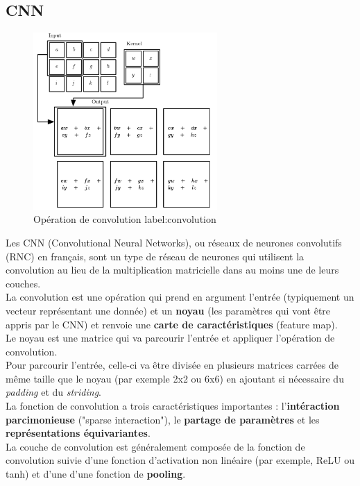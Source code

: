 \documentclass[11pt]{article}
\begin{document}
\subsection{CNN}
\label{sec:orgaf45cf3}
\begin{figure}[htbp]
\centering
\includegraphics[width=7cm]{convolution.png}
\caption{Opération de convolution label:convolution}
\end{figure}
Les CNN (Convolutional Neural Networks), ou réseaux de neurones convolutifs (RNC) en français, sont un type de réseau de neurones qui utilisent la convolution au lieu de la multiplication matricielle dans au moins une de leurs couches.\\
La convolution est une opération qui prend en argument l'entrée (typiquement un vecteur représentant une donnée) et un \textbf{noyau} (les paramètres qui vont être appris par le CNN) et renvoie une \textbf{carte de caractéristiques} (feature map).\\
Le noyau est une matrice qui va parcourir l'entrée et appliquer l'opération de convolution.\\
Pour parcourir l'entrée, celle-ci va être divisée en plusieurs matrices carrées de même taille que le noyau (par exemple 2x2 ou 6x6) en ajoutant si nécessaire du \emph{padding} et du \emph{striding}.\\
La fonction de convolution a trois caractéristiques importantes : l'\textbf{intéraction parcimonieuse} ("sparse interaction"), le \textbf{partage de paramètres} et les \textbf{représentations équivariantes}.\\
La couche de convolution est généralement composée de la fonction de convolution suivie d'une fonction d'activation non linéaire (par exemple, ReLU ou tanh) et d'une d'une fonction de \textbf{pooling}.\\
\end{document}
